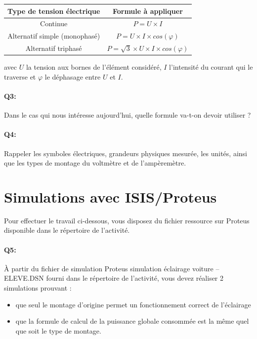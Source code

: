 \documentclass{article}
\begin{document}
\begin{center}
	\begin{tabular}{|c|c|}
		\hline
		Type de tension électrique & Formule à appliquer \\
		\hline
		\hline
		Continue & $P = U \times I$\\
		\hline
		Alternatif simple (monophasé) & $P = U \times I \times cos(\varphi)$ \\
		\hline
		Alternatif triphasé & $P = \sqrt{3} \times U \times I \times cos(\varphi)$\\
	
		\hline
	\end{tabular}

	avec $U$ la tension aux bornes de l’élément considéré, $I$ l’intensité du courant qui le traverse
	et $\varphi$ le déphasage entre $U$ et $I$.
\end{center}

\vspace{1em}
\paragraph{Q3:} Dans le cas qui nous intéresse aujourd’hui, quelle formule va-t-on devoir utiliser ?

\paragraph{Q4:} Rappeler les symboles électriques, grandeurs physiques mesurée, les unités, ainsi que les types de montage du voltmètre et de l'ampèremètre.

\section{Simulations avec ISIS/Proteus}
Pour effectuer le travail ci-dessous, vous disposez du fichier ressource sur Proteus disponible dans le répertoire de l’activité.

\paragraph{Q5:} À partir du fichier de simulation Proteus \og{}simulation éclairage voiture –ELEVE.DSN\fg{} 
fourni dans le répertoire de l’activité, vous devez réaliser 2 simulations prouvant :
\begin{itemize}
	\item que seul le montage d’origine permet un fonctionnement correct de l’éclairage
	\item que la formule de calcul de la puissance globale consommée est la même quel que soit le type de montage.
\end{itemize}
\end{document}
